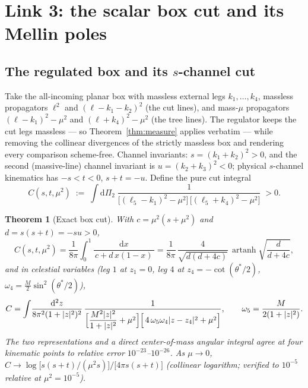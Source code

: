 \documentclass[12pt,a4paper]{article}
\theoremstyle{plain}
\newtheorem{theorem}{Theorem}[section]
\theoremstyle{definition}
\theoremstyle{remark}
\newcommand{\dd}{\mathrm{d}}
\newcommand{\dLIPS}{\dd\Pi_2}
\begin{document}
\section{Link 3: the scalar box cut and its Mellin poles}
\label{sec:link3}

\subsection{The regulated box and its $s$-channel cut}

Take the all-incoming planar box with massless external legs
$k_1,\dots,k_4$, massless propagators $\ell^2$ and $(\ell-k_1-k_2)^2$
(the cut lines), and mass-$\mu$ propagators $(\ell-k_1)^2-\mu^2$ and
$(\ell+k_4)^2-\mu^2$ (the tree lines).  The regulator keeps the cut
legs massless --- so Theorem~\ref{thm:measure} applies verbatim ---
while removing the collinear divergences of the strictly massless box
and rendering every comparison scheme-free.  Channel invariants:
$s=(k_1+k_2)^2>0$, and the second (massive-line) channel invariant is
$u=(k_2+k_3)^2<0$; physical $s$-channel kinematics has
$-s<t<0$, $s+t=-u$.  Define the pure cut integral
\begin{equation}
C(s,t,\mu^2)\;:=\;\int \dLIPS\;
\frac{1}{\bigl[(\ell_5-k_1)^2-\mu^2\bigr]\,
\bigl[(\ell_5+k_4)^2-\mu^2\bigr]}\;>0 .
\label{eq:cutdef}
\end{equation}

\begin{theorem}[Exact box cut]
\label{thm:boxcut}
With $c=\mu^2(s+\mu^2)$ and $d=s(s+t)=-su>0$,
\begin{equation}
C(s,t,\mu^2)
=\frac{1}{8\pi}\int_0^1\!\frac{\dd x}{\,c+d\,x(1-x)\,}
=\frac{1}{8\pi}\,\frac{4}{\sqrt{d(d+4c)}}\,
\operatorname{artanh}\!\sqrt{\frac{d}{d+4c}} ,
\label{eq:cutclosed}
\end{equation}
and in celestial variables (leg $1$ at $z_1=0$, leg $4$ at
$z_4=-\cot(\theta^*/2)$, $\omega_4=\tfrac{M}{2}\sin^2(\theta^*/2)$),
\begin{equation}
C=\int\!\frac{\dd^2 z}{8\pi^2(1+|z|^2)^2}\,
\frac{1}{\Bigl[\dfrac{M^2|z|^2}{1+|z|^2}+\mu^2\Bigr]
\Bigl[\,4\,\omega_5\omega_4|z-z_4|^2+\mu^2\Bigr]},
\qquad \omega_5=\frac{M}{2(1+|z|^2)} .
\label{eq:cutcelestial}
\end{equation}
The two representations and a direct center-of-mass angular integral
agree at four kinematic points to relative error
$10^{-23}$--$10^{-26}$.  As $\mu\to0$,
$C\to \log\!\bigl[s(s+t)/(\mu^2 s)\bigr]/\bigl[4\pi s(s+t)\bigr]$
(collinear logarithm; verified to $10^{-5}$ relative at
$\mu^2=10^{-5}$).
\end{theorem}
\end{document}
